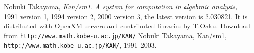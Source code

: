 
\begin{thebibliography}{ }

	Nobuki Takayama,
	{\em Kan/sm1: A system for computation in
	algebraic analysis,} 1991 version 1,
        1994 version 2, 2000 version 3, the latest version is 3.030821.
    It is distributed with OpenXM servers and contributed libraries by T.Oaku.
        Download from {\tt \small http://www.math.kobe-u.ac.jp/KAN/}
	Nobuki Takayama,
	Kan/sm1, 
    {\tt \small http://www.math.kobe-u.ac.jp/KAN/},
    1991--2003.
\end{thebibliography}
